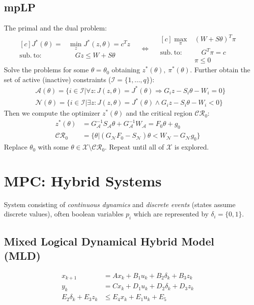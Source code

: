 \documentclass[a4paper,landscape,8pt,fleqn]{scrartcl}
\newcommand{\mc}[1]{\mathcal{#1}}
\begin{document}
\begin{multicols}{3}
\subsection{mpLP}
The primal and the dual problem:
\begin{equation*}
\begin{aligned}[c]
J^*(\theta) = &\min_z J^*(z,\theta) = c^T z \\
	\mathrm{sub.~to:}& \quad Gz \leq W + S\theta\end{aligned}
\quad\Leftrightarrow\quad
\begin{aligned}[c]
\max_\pi& (W+S\theta)^T \pi \\
\mathrm{sub.~to:}&\quad G^T \pi = c \\
&\pi \leq 0
\end{aligned}
\end{equation*}
Solve the problems for some $\theta = \theta_0$ obtaining $z^*(\theta),~\pi^*(\theta)$. Further obtain the set of active (inactive) constraints ($\mc{I} = \{1,\dots,q\}$):
\begin{align*}
	&\mc{A}(\theta) = \{i\in \mc{I}| \forall z: J(z,\theta) = J^*(\theta) \Rightarrow G_i z - S_i \theta - W_i = 0\} \\
	&\mc{N}(\theta) = \{i\in \mc{I}| \exists z: J(z,\theta) = J^*(\theta) \wedge G_i z - S_i \theta - W_i < 0\}
\end{align*}
Then we compute the optimizer $z^*(\theta)$ and the critical region $\mc{CR}_0$:
\begin{align*}
	z^*(\theta) &= G^{-1}_\mc{A} S_\mc{A} \theta + G^{-1}_\mc{A} W_\mc{A} = F_0 \theta + g_0 \\
	\mc{CR}_0 &= \{ \theta | (G_\mc{N} F_0 - S_\mc{N})\theta < W_\mc{N} - G_\mc{N}g_0 \}
\end{align*}
Replace $\theta_0$ with some $\theta \in \mc{X} \setminus \mc{CR}_0$. Repeat until all of $\mc{X}$ is explored.
\section{MPC: Hybrid Systems}
System consisting of \emph{continuous dynamics} and \emph{discrete events} (states assume discrete values), often boolean variables $p_i$ which are represented by $\delta_i = \{0,1\}$.
\subsection{Mixed Logical Dynamical Hybrid Model (MLD)}
\begin{align*}
	x_{k+1} &= A x_k + B_1 u_k + B_2 \delta_k + B_3 z_k \\
	y_k &= C x_k  + D_1 u_k + D_2 \delta_k + D_3 z_k\\
	E_2 \delta_k + E_3 z_k &\leq E_4 x_k + E_1 u_k + E_5
\end{align*}

\end{multicols}
\end{document}
